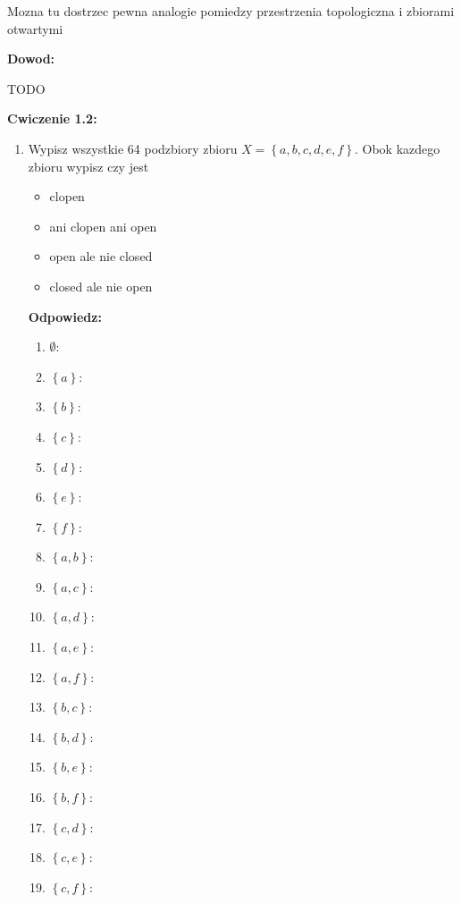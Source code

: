 \documentclass{article}
\begin{document}
Mozna tu dostrzec pewna analogie pomiedzy przestrzenia topologiczna i zbiorami otwartymi

\textbf{Dowod:}

TODO

\hrulefill
\textbf{Cwiczenie 1.2:}
\begin{enumerate}%

\item Wypisz wszystkie 64 podzbiory zbioru $X = \left\{a,b,c,d,e,f \right\}$. Obok kazdego zbioru wypisz czy jest 
    \begin{itemize}
        \item clopen
        \item ani clopen ani open
        \item open ale nie closed
        \item closed ale nie open
    \end{itemize}

\textbf{Odpowiedz:}
\begin{enumerate} %
    
\item $\emptyset$:
\item $\left\{ a \right\}$:
\item $\left\{ b \right\}$:
\item $\left\{ c \right\}$:
\item $\left\{ d \right\}$:
\item $\left\{ e \right\}$:
\item $\left\{ f \right\}$:

\item $\left\{ a,b \right\}$:
\item $\left\{ a,c \right\}$:
\item $\left\{ a,d \right\}$:
\item $\left\{ a,e \right\}$:
\item $\left\{ a,f \right\}$:

\item $\left\{ b,c \right\}$:
\item $\left\{ b,d \right\}$:
\item $\left\{ b,e \right\}$:
\item $\left\{ b,f \right\}$:

\item $\left\{ c,d \right\}$:
\item $\left\{ c,e \right\}$:
\item $\left\{ c,f \right\}$:


\end{enumerate}
\end{enumerate}
\end{document}
